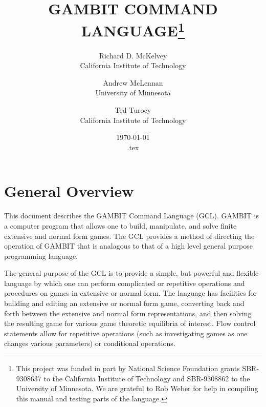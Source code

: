 %
%
%
\renewcommand{\baselinestretch}{.9}
\newcommand{\bd}{\begin{description}}
\newcommand{\ed}{\end{description}}


\title{GAMBIT COMMAND LANGUAGE\thanks{This project was funded in part
by National Science Foundation grants SBR-9308637 to the California
Institute of Technology and SBR-9308862 to the University of
Minnesota.  We are grateful to Rob Weber for help in compiling this manual
and testing parts of the language.}}

\author{Richard D. McKelvey\\California Institute of
Technology
\and
Andrew McLennan\\University of
Minnesota
\and 
Ted Turocy\\California Institute of Technology
}

\date{\today\\ \jobname.tex}

\maketitle

\tableofcontents

\section{General Overview}

This document describes the GAMBIT Command Language (GCL).  GAMBIT is
a computer program that allows one to build, manipulate, and solve
finite extensive and normal form games. The GCL provides a method of
directing the operation of GAMBIT that is analagous to that of a high
level general purpose programming language.

The general purpose of the GCL is to provide a simple, but powerful
and flexible language by which one can perform complicated or
repetitive operations and procedures on games in extensive or normal
form.  The language has facilities for building and editing an
extensive or normal form game, converting back and forth between the
extensive and normal form representations, and then solving the
resulting game for various game theoretic equilibria of interest. Flow
control statements allow for repetitive operations (such as
investigating games as one changes various parameters) or conditional
operations.

